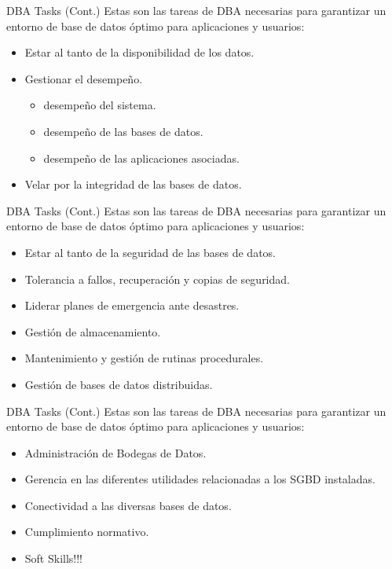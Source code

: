 \documentclass{beamer}
\begin{document}
\begin{frame}{DBA Tasks (Cont.)}
    \centering
    Estas son las tareas de DBA necesarias para garantizar un entorno de base de datos óptimo para aplicaciones y usuarios:
    \begin{itemize}
        \item Estar al tanto de la disponibilidad de los datos.
        \item Gestionar el desempeño.
        \begin{itemize}
            \item desempeño del sistema.
            \item desempeño de las bases de datos.
            \item desempeño de las aplicaciones asociadas.
        \end{itemize}
        \item Velar por la integridad de las bases de datos.
    \end{itemize}
\end{frame}

\begin{frame}{DBA Tasks (Cont.)}
    \centering
    Estas son las tareas de DBA necesarias para garantizar un entorno de base de datos óptimo para aplicaciones y usuarios:
    \begin{itemize}
        \item Estar al tanto de la seguridad de las bases de datos.
        \item Tolerancia a fallos, recuperación y copias de seguridad.
        \item Liderar planes de emergencia ante desastres.
        \item Gestión de almacenamiento.
        \item Mantenimiento y gestión de rutinas procedurales.
        \item Gestión de bases de datos distribuidas.
    \end{itemize}
\end{frame}

\begin{frame}{DBA Tasks (Cont.)}
    \centering
    Estas son las tareas de DBA necesarias para garantizar un entorno de base de datos óptimo para aplicaciones y usuarios:
    \begin{itemize}
        \item Administración de Bodegas de Datos.
        \item Gerencia en las diferentes utilidades relacionadas a los SGBD instaladas.
        \item Conectividad a las diversas bases de datos.
        \item Cumplimiento normativo.
        \item Soft Skills!!!
    \end{itemize}
\end{frame}
\end{document}
